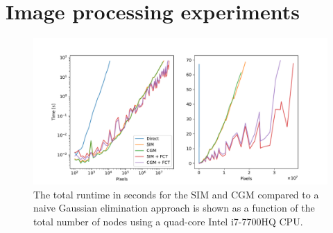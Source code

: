 











\section{Image processing experiments}

\label{sec:im_proc_exp}


\begin{figure}[t]
    \hypertarget{runtime}{}
    \label{fig:runtime}
    \begin{center}
        \includegraphics[width=\linewidth]{Figures/SIM_CGM_time.pdf}
    \end{center}
    \caption{\small{ The total runtime in seconds for the SIM and CGM compared to a naive Gaussian elimination approach is shown as a function of the total number of nodes using a quad-core Intel i7-7700HQ CPU. } }
\end{figure}


